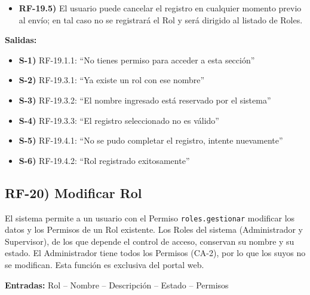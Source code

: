 \begin{itemize}[label={}, leftmargin=1.5em]
\begin{itemize}[label={}, leftmargin=1.5em]
    \item \textbf{RF-19.4.1)} Si la operaci\'on falla, no se registrar\'a el Rol ni sus Permisos (rollback) y se notificar\'a: ``No se pudo completar el registro, intente nuevamente''.
    \item \textbf{RF-19.4.2)} Si se completa, se desplegar\'a el mensaje: ``Rol registrado exitosamente'' y el usuario ser\'a dirigido al listado de Roles (RF-21).
  \end{itemize}
  \item \textbf{RF-19.5)} El usuario puede cancelar el registro en cualquier momento previo al env\'io; en tal caso no se registrar\'a el Rol y ser\'a dirigido al listado de Roles.
\end{itemize}

\textbf{Salidas:}
\begin{itemize}[label={}, leftmargin=1.5em]
  \item \textbf{S-1)} RF-19.1.1: ``No tienes permiso para acceder a esta secci\'on''
  \item \textbf{S-2)} RF-19.3.1: ``Ya existe un rol con ese nombre''
  \item \textbf{S-3)} RF-19.3.2: ``El nombre ingresado est\'a reservado por el sistema''
  \item \textbf{S-4)} RF-19.3.3: ``El registro seleccionado no es v\'alido''
  \item \textbf{S-5)} RF-19.4.1: ``No se pudo completar el registro, intente nuevamente''
  \item \textbf{S-6)} RF-19.4.2: ``Rol registrado exitosamente''
\end{itemize}

\subsection*{RF-20) Modificar Rol}
El sistema permite a un usuario con el Permiso \texttt{roles.gestionar} modificar los datos y los Permisos de un Rol existente. Los Roles del sistema (Administrador y Supervisor), de los que depende el control de acceso, conservan su nombre y su estado. El Administrador tiene todos los Permisos (CA-2), por lo que los suyos no se modifican. Esta funci\'on es exclusiva del portal web.

\textbf{Entradas:} Rol -- Nombre -- Descripci\'on -- Estado -- Permisos

